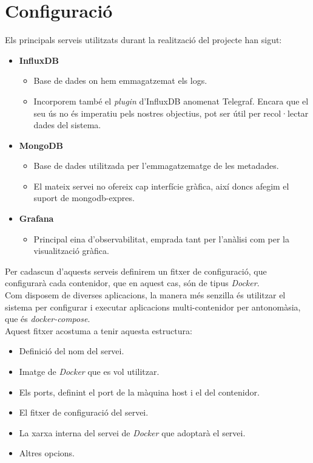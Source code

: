 \clearpage

\section{Configuració}\label{sec:server-configuration}

Els principals serveis utilitzats durant la realització del projecte han sigut:

\begin{itemize}
    \item \textbf{InfluxDB}
    \begin{itemize}
        \item Base de dades on hem emmagatzemat els logs.
        \item {
            Incorporem també el \textit{\gls{plugin}} d’InfluxDB anomenat Telegraf.
            Encara que el seu ús no és imperatiu pels nostres objectius, pot ser útil per recol·lectar dades del sistema.
        }
    \end{itemize}
    \item \textbf{MongoDB}
    \begin{itemize}
        \item Base de dades utilitzada per l’emmagatzematge de les metadades.
        \item El mateix servei no ofereix cap interfície gràfica, així doncs afegim el suport de mongodb-expres.
    \end{itemize}
    \item \textbf{Grafana}
    \begin{itemize}
        \item Principal eina d’observabilitat, emprada tant per l’anàlisi com per la visualització gràfica.
    \end{itemize}
\end{itemize}

\noindent
Per cadascun d’aquests serveis definirem un fitxer de configuració, que configurarà cada contenidor, que en aquest cas, són de tipus \textit{\gls{Docker}}. \\

\noindent
Com disposem de diverses aplicacions, la manera més senzilla és utilitzar el sistema per configurar i executar aplicacions multi-contenidor per antonomàsia, que és \textit{\gls{docker-compose}}. \\

\noindent
Aquest fitxer acostuma a tenir aquesta estructura:

\begin{itemize}
    \item Definició del nom del servei.
    \item Imatge de \textit{\gls{Docker}} que es vol utilitzar.
    \item Els ports, definint el port de la màquina host i el del contenidor.
    \item El fitxer de configuració del servei.
    \item La xarxa interna del servei de \textit{\gls{Docker}} que adoptarà el servei.
    \item Altres opcions.
\end{itemize}

